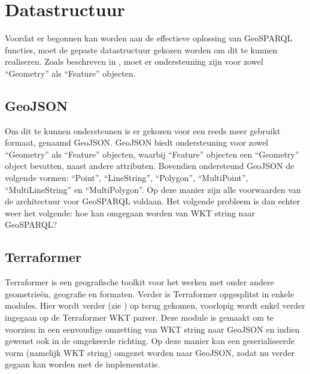 \section{Datastructuur}
\label{sec:datastructuur}
Voordat er begonnen kan worden aan de effectieve oplossing van GeoSPARQL functies, moet de gepaste datastructuur gekozen worden om dit te kunnen realiseren. Zoals beschreven in , moet er ondersteuning zijn voor zowel ``Geometry'' als ``Feature'' objecten. 

\subsection{GeoJSON}
Om dit te kunnen ondersteunen is er gekozen voor een reeds meer gebruikt formaat, genaamd GeoJSON. GeoJSON biedt ondersteuning voor zowel ``Geometry'' als ``Feature'' objecten, waarbij ``Feature'' objecten een ``Geometry'' object bevatten, naast andere attributen. Bovendien ondersteund GeoJSON de volgende vormen: ``Point'', ``LineString'', ``Polygon'', ``MultiPoint'', ``MultiLineString'' en ``MultiPolygon''. Op deze manier zijn alle voorwaarden van de architectuur voor GeoSPARQL voldaan. Het volgende probleem is dan echter weer het volgende: hoe kan omgegaan worden van WKT string naar GeoSPARQL?

\subsection{Terraformer}
Terraformer is een geografische toolkit voor het werken met onder andere geometrieën, geografie en formaten. Verder is Terraformer opgesplitst in enkele modules. Hier wordt verder (zie ) op terug gekomen, voorlopig wordt enkel verder ingegaan op de Terraformer WKT parser. Deze module is gemaakt om te voorzien in een eenvoudige omzetting van WKT string naar GeoJSON en indien gewenst ook in de omgekeerde richting. Op deze manier kan een geserialiseerde vorm (namelijk WKT string) omgezet worden naar GeoJSON, zodat nu verder gegaan kan worden met de implementatie. 



